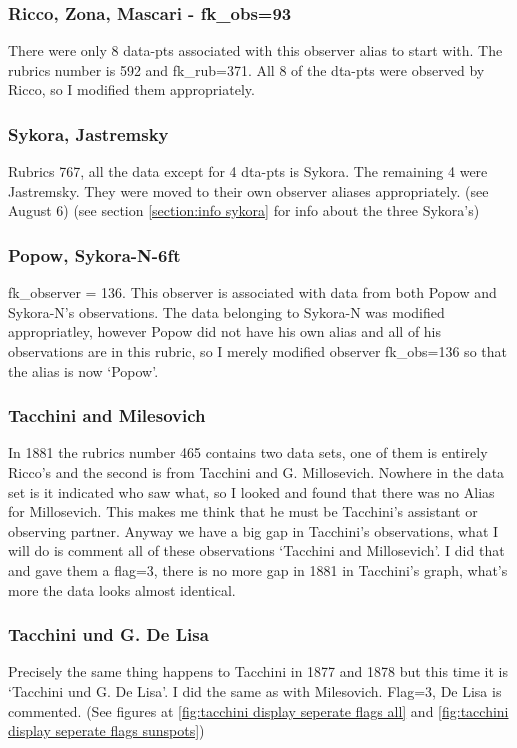 \documentclass[12pt]{article}
\begin{document}
\subsubsection{Ricco, Zona, Mascari - fk\_obs=93}
There were only 8 data-pts associated with this observer alias to start with. The rubrics number is 592 and fk\_rub=371. All 8 of the dta-pts were observed by Ricco, so I modified them appropriately.

\subsubsection{Sykora, Jastremsky}
Rubrics 767, all the data except for 4 dta-pts is Sykora. The remaining 4 were Jastremsky. They were moved to their own observer aliases appropriately. (see August 6) (see section \ref{section:info sykora} for info about the three Sykora's)

\subsubsection{Popow, Sykora-N-6ft}
fk\_observer = 136. This observer is associated with data from both Popow and Sykora-N's observations. The data belonging to Sykora-N was modified appropriatley, however Popow did not have his own alias and all of his observations are in this rubric, so I merely modified observer fk\_obs=136 so that the alias is now `Popow'.

\subsubsection{Tacchini and Milesovich}
In 1881 the rubrics number 465 contains two data sets, one of them is entirely Ricco's and the second is from Tacchini and G. Millosevich. Nowhere in the data set is it indicated who saw what, so I looked and found that there was no Alias for Millosevich. This makes me think that he must be Tacchini's assistant or observing partner. Anyway we have a big gap in Tacchini's observations, what I will do is comment all of these observations `Tacchini and Millosevich'. I did that and gave them a flag=3, there is no more gap in 1881 in Tacchini's graph, what's more the data looks almost identical. 

\subsubsection{Tacchini und G. De Lisa}
Precisely the same thing happens to Tacchini in 1877 and 1878 but this time it is `Tacchini und G. De Lisa'. I did the same as with Milesovich. Flag=3, De Lisa is commented. (See figures at \ref{fig:tacchini display seperate flags all} and \ref{fig:tacchini display seperate flags sunspots})
\end{document}
